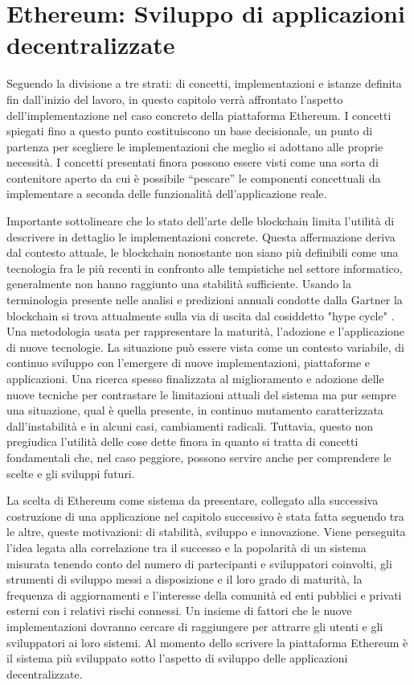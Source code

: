 \chapter{Ethereum: Sviluppo di applicazioni decentralizzate}

Seguendo la divisione a tre strati: di concetti, implementazioni e istanze definita fin dall'inizio del lavoro, in questo capitolo verrà affrontato l'aspetto dell'implementazione nel caso concreto della piattaforma Ethereum. I concetti spiegati fino a questo punto costituiscono un base decisionale, un punto di partenza per scegliere le implementazioni che meglio si adottano alle proprie necessità. I concetti presentati finora possono essere visti come una sorta di contenitore aperto da cui è possibile “pescare” le componenti concettuali da implementare a seconda delle funzionalità dell’applicazione reale. 

Importante sottolineare che lo stato dell'arte delle blockchain limita l’utilità di descrivere in dettaglio le implementazioni concrete. Questa affermazione deriva dal contesto attuale, le blockchain nonostante non siano più definibili come una tecnologia fra le più recenti in confronto alle tempistiche nel settore informatico, generalmente non hanno raggiunto una stabilità sufficiente. Usando la terminologia presente nelle analisi e predizioni annuali condotte dalla Gartner la blockchain si trova attualmente sulla via di uscita dal cosiddetto "hype cycle" \smallskip {}. Una metodologia usata per rappresentare la maturità, l'adozione e l'applicazione di nuove tecnologie.
La situazione può essere vista come un contesto variabile, di continuo sviluppo con l’emergere di nuove implementazioni, piattaforme e applicazioni. Una ricerca spesso finalizzata al miglioramento e adozione delle nuove tecniche per contrastare le limitazioni attuali del sistema ma pur sempre una situazione, qual è quella presente, in continuo mutamento caratterizzata dall'instabilità e in alcuni casi, cambiamenti radicali. Tuttavia, questo non pregiudica l’utilità delle cose dette finora in quanto si tratta di concetti fondamentali che, nel caso peggiore, possono servire anche per comprendere le scelte e gli sviluppi futuri. 

La scelta di Ethereum come sistema da presentare, collegato alla successiva costruzione di una applicazione nel capitolo successivo è stata fatta seguendo tra le altre, queste motivazioni: di stabilità, sviluppo e innovazione. Viene perseguita l'idea legata alla correlazione tra il successo e la popolarità di un sistema misurata tenendo conto del numero di partecipanti e sviluppatori coinvolti, gli strumenti di sviluppo messi a disposizione e il loro grado di maturità, la frequenza di aggiornamenti e l’interesse della comunità ed enti pubblici e privati esterni con i relativi rischi connessi. Un insieme di fattori che le nuove implementazioni dovranno cercare di raggiungere per attrarre gli utenti e gli sviluppatori ai loro sistemi. Al momento dello scrivere la piattaforma Ethereum è il sistema più sviluppato sotto l’aspetto di sviluppo delle applicazioni decentralizzate.

